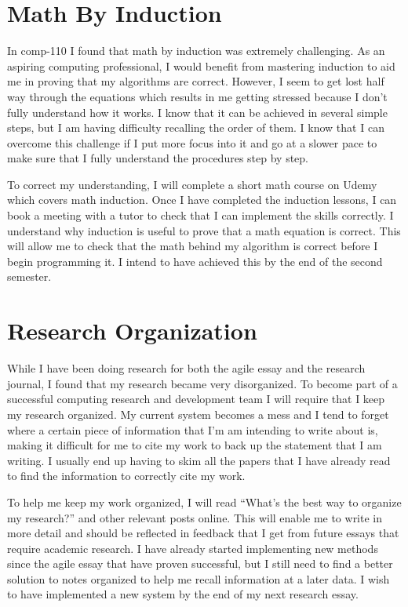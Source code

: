\documentclass{scrartcl}
\begin{document}
\section{Math By Induction}

In comp-110 I found that math by induction was extremely challenging. As an aspiring computing professional, I would benefit from mastering induction to aid me in proving that my algorithms are correct. However, I seem to get lost half way through the equations which results in me getting stressed because I don’t fully understand how it works. I know that it can be achieved in several simple steps, but I am having difficulty recalling the order of them. I know that I can overcome this challenge if I put more focus into it and go at a slower pace to make sure that I fully understand the procedures step by step.

To correct my understanding, I will complete a short math course on Udemy \cite{Udemy} which covers math induction. Once I have completed the induction lessons, I can book a meeting with a tutor to check that I can implement the skills correctly. I understand why induction is useful to prove that a math equation is correct. This will allow me to check that the math behind my algorithm is correct before I begin programming it. I intend to have achieved this by the end of the second semester. 

\section{Research Organization}

While I have been doing research for both the agile essay and the research journal, I found that my research became very disorganized. To become part of a successful computing research and development team I will require that I keep my research organized. My current system becomes a mess and I tend to forget where a certain piece of information that I’m am intending to write about is, making it difficult for me to cite my work to back up the statement that I am writing. I usually end up having to skim all the papers that I have already read to find the information to correctly cite my work.

To help me keep my work organized, I will read ``What’s the best way to organize my research?'' \cite{research} and other relevant posts online. This will enable me to write in more detail and should be reflected in feedback that I get from future essays that require academic research. I have already started implementing new methods since the agile essay that have proven successful, but I still need to find a better solution to notes organized to help me recall information at a later data. I wish to have implemented a new system by the end of my next research essay.
\end{document}
